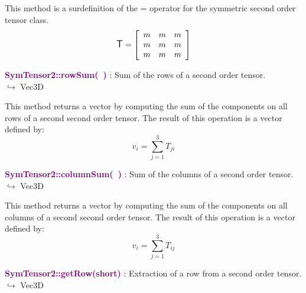 This method is a surdefinition of the = operator for the symmetric second order tensor class.
\begin{equation*}
\mbox{\large\ensuremath{\mathsf{T}}}=\left[\begin{array}{ccc}
m&m&m\\
m&m&m\\
m&m&m
\end{array}\right]
\end{equation*}

\textcolor{purple}{\textbf{SymTensor2::rowSum(~)}}\label{SymTensor2::rowSum()} : Sum of the rows of a second order tensor.\\ \hspace*{5mm}$\hookrightarrow$ Vec3D

This method returns a vector by computing the sum of the components on all rows of a second second order tensor.
The result of this operation is a vector defined by:
\begin{equation*}
v_{i}=\sum_{j=1}^{3} T_{ji}
\end{equation*}

\textcolor{purple}{\textbf{SymTensor2::columnSum(~)}}\label{SymTensor2::columnSum()} : Sum of the columns of a second order tensor.\\ \hspace*{5mm}$\hookrightarrow$ Vec3D

This method returns a vector by computing the sum of the components on all columns of a second second order tensor.
The result of this operation is a vector defined by:
\begin{equation*}
v_{i}=\sum_{j=1}^{3}T_{ij}
\end{equation*}

\textcolor{purple}{\textbf{SymTensor2::getRow(short)}}\label{SymTensor2::getRow(short)} : Extraction of a row from a second order tensor.\\ \hspace*{5mm}$\hookrightarrow$ Vec3D

